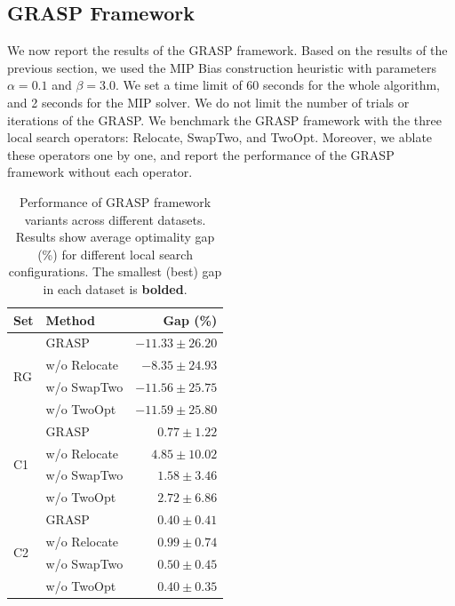 \subsection{GRASP Framework}

We now report the results of the GRASP framework. 
Based on the results of the previous section, we used the MIP Bias construction heuristic with parameters $\alpha = 0.1$ and $\beta = 3.0$.
We set a time limit of 60 seconds for the whole algorithm, and 2 seconds for the MIP solver.
We do not limit the number of trials or iterations of the GRASP. We benchmark the GRASP framework with the three local search operators: Relocate, SwapTwo, and TwoOpt.
Moreover, we ablate these operators one by one, and report the performance of the GRASP framework without each operator.


\begin{table}[h]
    \caption{Performance of GRASP framework variants across different datasets. Results show average optimality gap (\%) for different local search configurations. The smallest (best) gap in each dataset is \textbf{bolded}.}
    \label{tab:grasp_performance}
    \centering
    \begin{tabular}{llr}
        \toprule
        \textbf{Set} & \textbf{Method} & \textbf{Gap (\%)} \\
        \midrule
        \multirow[c]{4}{*}{RG} 
            & GRASP & $-11.33 \pm 26.20$ \\
            & w/o Relocate & $-8.35 \pm 24.93$ \\
            & w/o SwapTwo & $-11.56 \pm 25.75$ \\
            & w/o TwoOpt & $\mathbf{-11.59 \pm 25.80}$ \\
        \midrule
        \multirow[c]{4}{*}{C1} 
            & GRASP & $\mathbf{0.77 \pm 1.22}$ \\
            & w/o Relocate & $4.85 \pm 10.02$ \\
            & w/o SwapTwo & $1.58 \pm 3.46$ \\
            & w/o TwoOpt & $2.72 \pm 6.86$ \\
        \midrule
        \multirow[c]{4}{*}{C2} 
            & GRASP & $\mathbf{0.40 \pm 0.41}$ \\
            & w/o Relocate & $0.99 \pm 0.74$ \\
            & w/o SwapTwo & $0.50 \pm 0.45$ \\
            & w/o TwoOpt & $\mathbf{0.40 \pm 0.35}$ \\
        \bottomrule
    \end{tabular}
\end{table}

